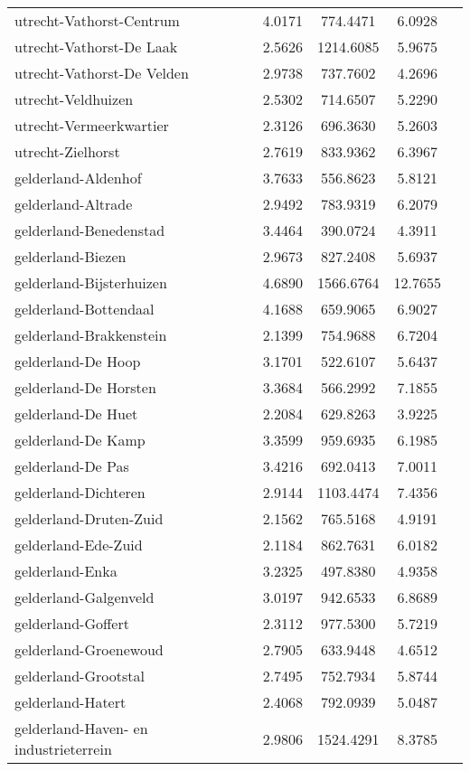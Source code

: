 \begin{longtable}{llccc}
utrecht-Vathorst-Centrum & 4.0171 & 774.4471 & 6.0928 \\
utrecht-Vathorst-De Laak & 2.5626 & 1214.6085 & 5.9675 \\
utrecht-Vathorst-De Velden & 2.9738 & 737.7602 & 4.2696 \\
utrecht-Veldhuizen & 2.5302 & 714.6507 & 5.2290 \\
utrecht-Vermeerkwartier & 2.3126 & 696.3630 & 5.2603 \\
utrecht-Zielhorst & 2.7619 & 833.9362 & 6.3967 \\
gelderland-Aldenhof & 3.7633 & 556.8623 & 5.8121 \\
gelderland-Altrade & 2.9492 & 783.9319 & 6.2079 \\
gelderland-Benedenstad & 3.4464 & 390.0724 & 4.3911 \\
gelderland-Biezen & 2.9673 & 827.2408 & 5.6937 \\
gelderland-Bijsterhuizen & 4.6890 & 1566.6764 & 12.7655 \\
gelderland-Bottendaal & 4.1688 & 659.9065 & 6.9027 \\
gelderland-Brakkenstein & 2.1399 & 754.9688 & 6.7204 \\
gelderland-De Hoop & 3.1701 & 522.6107 & 5.6437 \\
gelderland-De Horsten & 3.3684 & 566.2992 & 7.1855 \\
gelderland-De Huet & 2.2084 & 629.8263 & 3.9225 \\
gelderland-De Kamp & 3.3599 & 959.6935 & 6.1985 \\
gelderland-De Pas & 3.4216 & 692.0413 & 7.0011 \\
gelderland-Dichteren & 2.9144 & 1103.4474 & 7.4356 \\
gelderland-Druten-Zuid & 2.1562 & 765.5168 & 4.9191 \\
gelderland-Ede-Zuid & 2.1184 & 862.7631 & 6.0182 \\
gelderland-Enka & 3.2325 & 497.8380 & 4.9358 \\
gelderland-Galgenveld & 3.0197 & 942.6533 & 6.8689 \\
gelderland-Goffert & 2.3112 & 977.5300 & 5.7219 \\
gelderland-Groenewoud & 2.7905 & 633.9448 & 4.6512 \\
gelderland-Grootstal & 2.7495 & 752.7934 & 5.8744 \\
gelderland-Hatert & 2.4068 & 792.0939 & 5.0487 \\
gelderland-Haven- en industrieterrein & 2.9806 & 1524.4291 & 8.3785 \\

\end{longtable}
